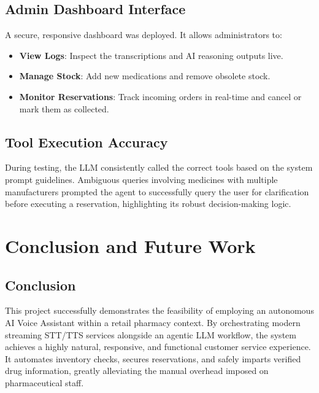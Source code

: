 \documentclass[12pt,a4paper]{report}
\begin{document}
\section{Admin Dashboard Interface}
A secure, responsive dashboard was deployed. It allows administrators to:
\begin{itemize}
    \item \textbf{View Logs}: Inspect the transcriptions and AI reasoning outputs live.
    \item \textbf{Manage Stock}: Add new medications and remove obsolete stock.
    \item \textbf{Monitor Reservations}: Track incoming orders in real-time and cancel or mark them as collected.
\end{itemize}

\section{Tool Execution Accuracy}
During testing, the LLM consistently called the correct tools based on the system prompt guidelines. Ambiguous queries involving medicines with multiple manufacturers prompted the agent to successfully query the user for clarification before executing a reservation, highlighting its robust decision-making logic.

\chapter{Conclusion and Future Work}

\section{Conclusion}
This project successfully demonstrates the feasibility of employing an autonomous AI Voice Assistant within a retail pharmacy context. By orchestrating modern streaming STT/TTS services alongside an agentic LLM workflow, the system achieves a highly natural, responsive, and functional customer service experience. It automates inventory checks, secures reservations, and safely imparts verified drug information, greatly alleviating the manual overhead imposed on pharmaceutical staff.
\end{document}
